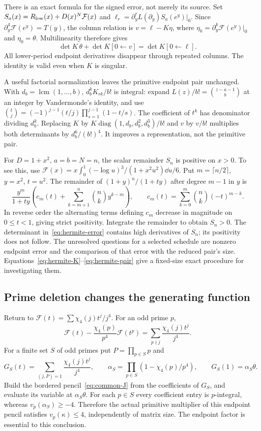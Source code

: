 There is an exact formula for the signed error, not merely its source.
Set $S_a(x)=R_{\rm low}(x)+D(x)^N\mathcal F(x)$ and
$\ell_r=\partial_y^rL(\partial_y)S_a(e^y)|_0$.
Since $\partial_y^4\mathcal F(e^y)=T(y)$, the column relation is
$v=\ell-K\eta$, where $\eta_k=\partial_y^k\mathcal F(e^y)|_0$ and
$\eta_0=\theta$. Multilinearity therefore gives
\begin{equation}\label{eq:hermite-error}
 \det K\,\theta+\det K[0\leftarrow v]=\det K[0\leftarrow\ell].
\end{equation}
All lower-period endpoint derivatives disappear through repeated columns.
The identity is valid even when $K$ is singular.

A useful factorial normalization leaves the primitive endpoint pair unchanged.
With $d_b=\operatorname{lcm}(1,\ldots,b)$,
$d_b^kK_{rk}/b!$ is integral: expand
$L(z)/b!=\binom{z-a-1}{b}$ at an integer by Vandermonde's identity,
and use
$\binom{t}{j}=(-1)^{j-1}(t/j)\prod_{s=1}^{j-1}(1-t/s)$.
The coefficient of $t^k$ has denominator dividing $d_b^k$.
Replacing $K$ by $K\operatorname{diag}(1,d_b,d_b^2,d_b^3)/b!$
and $v$ by $v/b!$ multiplies both determinants by
$d_b^6/(b!)^4$. It improves a representation, not the primitive pair.

For $D=1+x^2$, $a=b=N=n$, the scalar remainder $S_n$ is positive
on $x>0$. To see this, use
$\mathcal F(x)=x\int_0^1(-\log u)^3/(1+x^2u^2)\dd u/6$.
Put $m=\lceil n/2\rceil$, $y=x^2$, $t=u^2$. The remainder of
$(1+y)^n/(1+ty)$ after degree $m-1$ in $y$ is
\[
 \frac{y^m}{1+ty}\left(c_m(t)+\sum_{k=m+1}^n\binom nk y^{k-m}\right),
 \qquad c_m(t)=\sum_{k=0}^m\binom nk(-t)^{m-k}.
\]
In reverse order the alternating terms defining $c_m$ decrease in
magnitude on $0\leq t<1$, giving strict positivity. Integrate the
remainder to obtain $S_n>0$. The determinant in~\eqref{eq:hermite-error}
contains high derivatives of $S_n$; its positivity does not follow.
The unresolved questions for a selected schedule are nonzero endpoint
error and the comparison of that error with the reduced pair's size.
Equations~\eqref{eq:hermite-K}--\eqref{eq:hermite-pair} give a fixed-size
exact procedure for investigating them.

\subsection{Prime deletion changes the generating function}
Return to $\mathcal F(t)=\sum\chi_4(j)t^j/j^4$. For an odd prime $p$,
\[
 \mathcal F(t)-\frac{\chi_4(p)}{p^4}\mathcal F(t^p)
       =\sum_{p\nmid j}\frac{\chi_4(j)t^j}{j^4}.
\]
For a finite set $S$ of odd primes put $P=\prod_{p\in S}p$ and
\begin{equation}\label{eq:deleted-germ}
 G_S(t)=\sum_{(j,P)=1}\frac{\chi_4(j)t^j}{j^4},\qquad
 \alpha_S=\prod_{p\in S}(1-\chi_4(p)/p^4),\qquad G_S(1)=\alpha_S\theta.
\end{equation}
Build the bordered pencil~\eqref{eq:common-J} from the coefficients
of $G_S$, and evaluate its variable at $\alpha_S\theta$.
For each $p\in S$ every coefficient entry is $p$-integral, whereas
$v_p(\alpha_S)\geq-4$. Therefore the actual primitive multiplier of
this endpoint pencil satisfies $v_p(\kappa)\leq4$, independently of
matrix size. The endpoint factor is essential to this conclusion.

